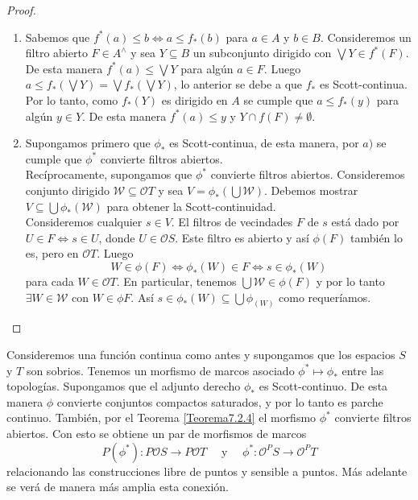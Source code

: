 \begin{proof}
    \begin{enumerate}
        \item Sabemos que $f^*(a)\leq b\Leftrightarrow a\leq f_*(b)$ para $a\in A$ y $b\in B$. Consideremos un filtro abierto $F\in A^\wedge$ y sea $Y\subseteq B$ un subconjunto dirigido con $\bigvee Y\in f^*(F)$. De esta manera $f^*(a)\leq \bigvee Y$ para algún $a\in F$. Luego $a\leq f_*(\bigvee Y)=\bigvee f_*(\bigvee Y)$, lo anterior se debe a que $f_*$ es Scott-continua.\\

        Por lo tanto, como $f_*(Y)$ es dirigido en $A$ se cumple que $a\leq f_*(y)$ para algún $y\in Y$. De esta manera $f^*(a)\leq y$ y $Y\cap f(F)\neq \emptyset$.

        \item Supongamos primero que $\phi_*$ es Scott-continua, de esta manera, por $a)$ se cumple que $\phi^*$ convierte filtros abiertos.\\

        Recíprocamente, supongamos que $\phi^*$ convierte filtros abiertos. Consideremos conjunto dirigido $\mathcal{W}\subseteq \mathcal{O}T$ y sea $V=\phi_*(\bigcup  \mathcal{W})$. Debemos mostrar $V\subseteq \bigcup \phi_*(\mathcal{W})$ para obtener la Scott-continuidad.\\

        Consideremos cualquier $s\in V$. El filtros de vecindades $F$ de $s$ está dado por $U\in F\Leftrightarrow s\in U$, donde $U\in \mathcal{O}S$. Este filtro es abierto y así $\phi(F)$ también lo es, pero en $\mathcal{O}T$. Luego
        \[
        W\in \phi(F)\Leftrightarrow \phi_*(W)\in F\Leftrightarrow s\in \phi_*(W)
        \]
        para cada $W\in \mathcal{O}T$. En particular, tenemos $\bigcup \mathcal{W}\in \phi(F)$ y por lo tanto $\exists W\in \mathcal{W}$ con $W\in \phi F$. Así $s\in \phi_*(W)\subseteq \bigcup \phi_(W)$ como requeríamos. 
    \end{enumerate}
\end{proof}

Consideremos una función continua como antes y supongamos que los espacios $S$ y $T$ son sobrios. Tenemos un morfismo de marcos asociado $\phi^*\mapsto \phi_*$ entre las topologías. Supongamos que el adjunto derecho $\phi_*$ es Scott-continuo. De esta manera $\phi$ convierte conjuntos compactos saturados, y por lo tanto es parche continuo. También, por el Teorema \ref{Teorema7.2.4} el morfismo $\phi^*$ convierte filtros abiertos. Con esto se obtiene un par de morfismos de marcos 
\[
P(\phi^*)\colon P\mathcal{O}S\to P\mathcal{O}T\quad \mbox{ y } \quad \phi^*\colon \mathcal{O}^PS\to \mathcal{O}^PT
\]
relacionando las construcciones libre de puntos y sensible a puntos. Más adelante se verá de manera más amplia esta conexión.


